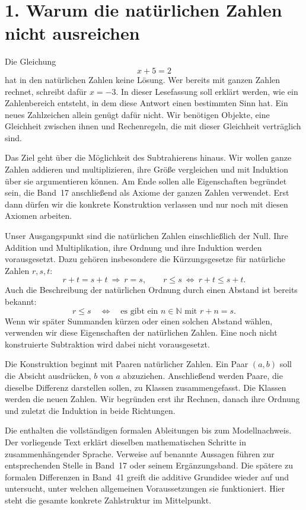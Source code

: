 \par{}
\hypertarget{integers.reading.problem}{}
\section*{1. Warum die natürlichen Zahlen nicht ausreichen}

Die Gleichung
\[
  x+5=2
\]
hat in den natürlichen Zahlen keine Lösung. Wer bereits mit ganzen Zahlen
rechnet, schreibt dafür \(x=-3\). In dieser Lesefassung soll erklärt
werden, wie ein Zahlenbereich entsteht, in dem diese Antwort einen
bestimmten Sinn hat. Ein neues Zahlzeichen allein genügt dafür nicht.
Wir benötigen Objekte, eine Gleichheit zwischen ihnen und Rechenregeln,
die mit dieser Gleichheit verträglich sind.

Das Ziel geht über die Möglichkeit des Subtrahierens hinaus. Wir wollen
ganze Zahlen addieren und multiplizieren, ihre Größe vergleichen und
mit Induktion über sie argumentieren können. Am Ende sollen alle
Eigenschaften begründet sein, die Band~17 anschließend als Axiome der
ganzen Zahlen verwendet. Erst dann dürfen wir die konkrete Konstruktion
verlassen und nur noch mit diesen Axiomen arbeiten.

Unser Ausgangspunkt sind die natürlichen Zahlen einschließlich der Null.
Ihre Addition und Multiplikation, ihre Ordnung und ihre Induktion werden
vorausgesetzt. Dazu gehören insbesondere die Kürzungsgesetze für
natürliche Zahlen \(r,s,t\):
\[
  r+t=s+t\ \Longrightarrow\ r=s,
  \qquad
  r\leq s\ \Longleftrightarrow\ r+t\leq s+t.
\]
Auch die Beschreibung der natürlichen Ordnung durch einen Abstand ist
bereits bekannt:
\[
  r\leq s
  \quad\Longleftrightarrow\quad
  \text{es gibt ein }n\in\mathbb N\text{ mit }r+n=s.
\]
Wenn wir später Summanden kürzen oder einen solchen Abstand wählen,
verwenden wir diese Eigenschaften der natürlichen Zahlen. Eine noch
nicht konstruierte Subtraktion wird dabei nicht vorausgesetzt.

Die Konstruktion beginnt mit Paaren natürlicher Zahlen. Ein Paar
\((a,b)\) soll die Absicht ausdrücken, \(b\) von \(a\) abzuziehen.
Anschließend werden Paare, die dieselbe Differenz darstellen sollen, zu
Klassen zusammengefasst. Die Klassen werden die neuen Zahlen. Wir
begründen erst ihr Rechnen, danach ihre Ordnung und zuletzt die
Induktion in beide Richtungen.

Die \IntegersProofsLink{} enthalten die
vollständigen formalen Ableitungen bis zum Modellnachweis. Der vorliegende
Text erklärt dieselben mathematischen Schritte in zusammenhängender
Sprache. Verweise auf benannte Aussagen führen zur entsprechenden
Stelle in Band~17 oder seinem Ergänzungsband. Die spätere
\DifferencesReadingLink{} zu formalen Differenzen in Band~41
greift die additive Grundidee wieder auf und untersucht, unter welchen
allgemeinen Voraussetzungen sie funktioniert. Hier steht die gesamte
konkrete Zahlstruktur im Mittelpunkt.

